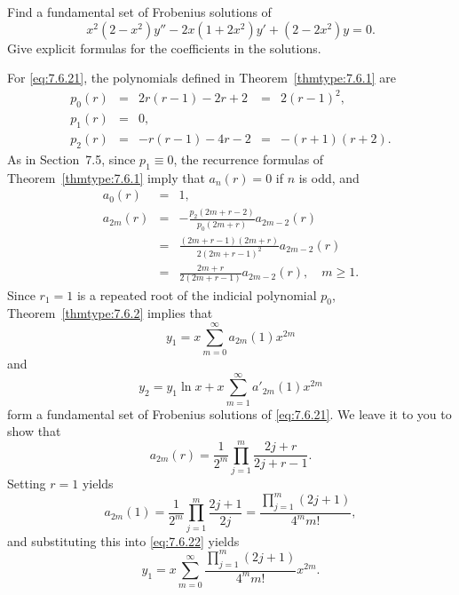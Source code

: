 \documentclass{ximera}
\begin{document}
\begin{example}\label{example:7.6.3}
Find a fundamental set of Frobenius  solutions of
\begin{equation} \label{eq:7.6.21}
x^2(2-x^2)y''-2x(1+2x^2)y'+(2-2x^2)y=0.
\end{equation}
Give explicit formulas for the coefficients in the solutions.

\begin{explanation}
For \eqref{eq:7.6.21}, the polynomials defined in
Theorem~\ref{thmtype:7.6.1} are
$$
\begin{array}{ccccc}
p_0(r)&=&2r(r-1)-2r+2&=&2(r-1)^2,\\
p_1(r)&=&0,\\
p_2(r)&=&-r(r-1)-4r-2&=&-(r+1)(r+2).
\end{array}
$$
As in Section~7.5, since $p_1\equiv0$,  the recurrence
formulas
of Theorem~\ref{thmtype:7.6.1} imply that $a_n(r)=0$ if $n$ is odd, and
$$
\begin{array}{ccl}
a_0(r)&=&1,\\
a_{2m}(r)&=&-\frac{p_2(2m+r-2)}{p_0(2m+r)}a_{2m-2}(r)\\
&=&\frac{(2m+r-1)(2m+r)}{2(2m+r-1)^2}a_{2m-2}(r)\\
&=&\frac{2m+r}{2(2m+r-1)}a_{2m-2}(r),\quad m\geq 1.
\end{array}
$$
Since $r_1=1$ is a repeated root of the indicial polynomial $p_0$,
Theorem~\ref{thmtype:7.6.2} implies that
\begin{equation} \label{eq:7.6.22}
y_1=x\sum_{m=0}^\infty  a_{2m}(1)x^{2m}
\end{equation}
and
\begin{equation} \label{eq:7.6.23}
y_2=y_1\ln x+x\sum_{m=1}^\infty a'_{2m}(1)x^{2m}
\end{equation}
form a fundamental set of Frobenius solutions of \eqref{eq:7.6.21}.
We leave it to you to show  that
\begin{equation} \label{eq:7.6.24}
a_{2m}(r)=\frac{1}{2^m}\prod_{j=1}^m\frac{2j+r}{2j+r-1}.
\end{equation}
Setting $r=1$ yields
\begin{equation} \label{eq:7.6.25}
a_{2m}(1)=\frac{1}{2^m}\prod_{j=1}^m\frac{2j+1}{2j}
=\frac{\prod_{j=1}^m(2j+1)}{4^mm!},
\end{equation}
and substituting this into \eqref{eq:7.6.22} yields
$$
y_1=x\sum_{m=0}^\infty\frac{\prod_{j=1}^m(2j+1)}{4^mm!}x^{2m}.
$$


\end{explanation}
\end{example}
\end{document}
